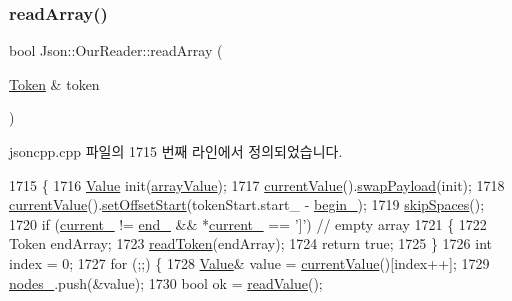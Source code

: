 \subsubsection{\texorpdfstring{read\+Array()}{readArray()}}
{\footnotesize\ttfamily bool Json\+::\+Our\+Reader\+::read\+Array (\begin{DoxyParamCaption}\item[{\hyperlink{class_json_1_1_our_reader_1_1_token}{Token} \&}]{token }\end{DoxyParamCaption})\hspace{0.3cm}{\ttfamily [private]}}



jsoncpp.\+cpp 파일의 1715 번째 라인에서 정의되었습니다.


\begin{DoxyCode}
1715                                            \{
1716   \hyperlink{class_json_1_1_value}{Value} init(\hyperlink{namespace_json_a7d654b75c16a57007925868e38212b4eadc8f264f36b55b063c78126b335415f4}{arrayValue});
1717   \hyperlink{class_json_1_1_our_reader_a2acd5b1d53e7d7e17c21ff8e96edc09d}{currentValue}().\hyperlink{class_json_1_1_value_a5263476047f20e2fc6de470e4de34fe5}{swapPayload}(init);
1718   \hyperlink{class_json_1_1_our_reader_a2acd5b1d53e7d7e17c21ff8e96edc09d}{currentValue}().\hyperlink{class_json_1_1_value_a92e32ea0f4f8a15853a3cf0beac9feb9}{setOffsetStart}(tokenStart.start\_ - 
      \hyperlink{class_json_1_1_our_reader_a9bda9d72335d52cd06e65f9eca3f70f5}{begin\_});
1719   \hyperlink{class_json_1_1_our_reader_a6fbc6d58a4505e5ccadf330b57b17ca5}{skipSpaces}();
1720   \textcolor{keywordflow}{if} (\hyperlink{class_json_1_1_our_reader_a5211fbbba94be80a22dd2317c621efcc}{current\_} != \hyperlink{class_json_1_1_our_reader_ab1f69b0260c27a0d2d65dc56e42c8f9d}{end\_} && *\hyperlink{class_json_1_1_our_reader_a5211fbbba94be80a22dd2317c621efcc}{current\_} == \textcolor{charliteral}{']'}) \textcolor{comment}{// empty array}
1721   \{
1722     Token endArray;
1723     \hyperlink{class_json_1_1_our_reader_a0d1e66da47fe2e85f5033c59326dfdc3}{readToken}(endArray);
1724     \textcolor{keywordflow}{return} \textcolor{keyword}{true};
1725   \}
1726   \textcolor{keywordtype}{int} index = 0;
1727   \textcolor{keywordflow}{for} (;;) \{
1728     \hyperlink{class_json_1_1_value}{Value}& value = \hyperlink{class_json_1_1_our_reader_a2acd5b1d53e7d7e17c21ff8e96edc09d}{currentValue}()[index++];
1729     \hyperlink{class_json_1_1_our_reader_a19cc4e8c5d17ee6822f752e9a36f4ce3}{nodes\_}.push(&value);
1730     \textcolor{keywordtype}{bool} ok = \hyperlink{class_json_1_1_our_reader_a1765d9670d191c89a57a22ea5591d35f}{readValue}();

\end{DoxyCode}
